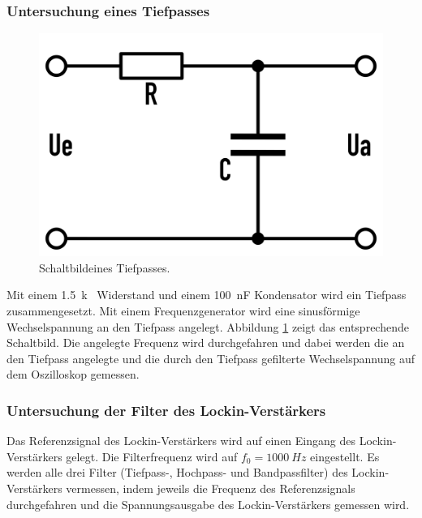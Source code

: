\documentclass[12pt,a4paper]{article}
\begin{document}
\subsubsection{Untersuchung eines Tiefpasses}

\begin{figure}
\centering
\includegraphics[scale=0.1]{Bilder/Vorversuch 1/Tiefpass_Schaltbild.png}
\caption[test]{Schaltbild\footnotemark eines Tiefpasses.}
\label{fig:Tiefpass_Schaltbild}
\end{figure}

Mit einem \SI{1,5}{k \Omega} Widerstand und einem \SI{100}{nF} Kondensator wird ein Tiefpass zusammengesetzt. Mit einem Frequenzgenerator wird eine sinusförmige Wechselspannung an den Tiefpass angelegt. Abbildung \ref{fig:Tiefpass_Schaltbild} zeigt das entsprechende Schaltbild. Die angelegte Frequenz wird durchgefahren und dabei werden die an den Tiefpass angelegte und die durch den Tiefpass gefilterte Wechselspannung auf dem Oszilloskop gemessen.

\subsubsection{Untersuchung der Filter des Lockin-Verstärkers}
Das Referenzsignal des Lockin-Verstärkers wird auf einen Eingang des Lockin-Verstärkers gelegt. Die Filterfrequenz wird auf $f_0 = \SI{1000}{Hz}$ eingestellt. Es werden alle drei Filter (Tiefpass-, Hochpass- und Bandpassfilter) des Lockin-Verstärkers vermessen, indem jeweils die Frequenz des Referenzsignals durchgefahren und die Spannungsausgabe des Lockin-Verstärkers gemessen wird.
\end{document}
